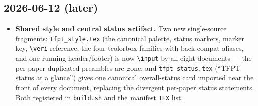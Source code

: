\subsection*{2026-06-12 (later)}
\begin{itemize}
\item \textbf{Shared style and central status artifact.} Two new single-source fragments:
  \texttt{tfpt\_style.tex} (the canonical palette, status markers, marker key, \texttt{\textbackslash veri}
  reference, the four tcolorbox families with back-compat aliases, and one running header/footer)
  is now \texttt{\textbackslash input} by all eight documents --- the per-paper duplicated preambles
  are gone; and \texttt{tfpt\_status.tex} (``TFPT status at a glance'') gives one canonical overall-status
  card imported near the front of every document, replacing the divergent per-paper status statements.
  Both registered in \texttt{build.sh} and the manifest \texttt{TEX} list.
\end{itemize}

